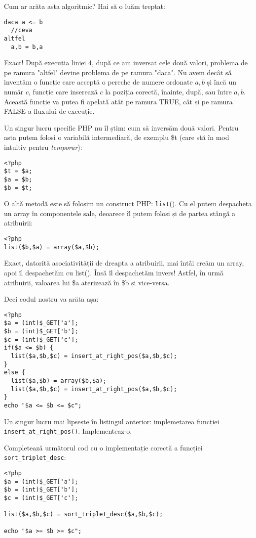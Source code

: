 Cum ar arăta asta algoritmic? Hai să o luăm treptat:
\begin{lstlisting}[language=pseudocod]
daca a <= b
  //ceva
altfel
  a,b = b,a
\end{lstlisting}
Exact! După execuția liniei 4, după ce am inversat cele două valori, problema de pe ramura
"altfel" devine problema de pe ramura "daca". Nu avem decât să inventăm o funcție
care acceptă o pereche de numere ordonate $a,b$ și încă un număr $c$, funcție care inserează
$c$ la poziția corectă, înainte, după, sau între $a,b$. Această funcție va putea
fi apelată atât pe ramura TRUE, cât și pe ramura FALSE a fluxului de execuție.

Un singur lucru specific PHP nu îl știm: cum să inversăm două valori. Pentru
asta putem folosi o variabilă intermediară, de exemplu \$t (care stă în mod intuitiv
pentru \textit{temporar}):
\begin{lstlisting}
<?php
$t = $a;
$a = $b;
$b = $t;
\end{lstlisting}

O altă metodă este să folosim un construct PHP: \texttt{list}().
Cu el putem despacheta un array în componentele sale, deoarece îl
putem folosi și de partea stângă a atribuirii:
\begin{lstlisting}
<?php
list($b,$a) = array($a,$b);
\end{lstlisting}
Exact, datorită asociativității de dreapta a atribuirii, mai întâi
creăm un array, apoi îl despachetăm cu list(). Însă îl despachetăm invers!
Astfel, în urmă atribuirii, valoarea lui \$a aterizează în \$b și vice-versa.

Deci codul nostru va arăta așa:
\begin{lstlisting}
<?php
$a = (int)$_GET['a'];
$b = (int)$_GET['b'];
$c = (int)$_GET['c'];
if($a <= $b) {
  list($a,$b,$c) = insert_at_right_pos($a,$b,$c);
}
else {
  list($a,$b) = array($b,$a);
  list($a,$b,$c) = insert_at_right_pos($a,$b,$c);
}
echo "$a <= $b <= $c";
\end{lstlisting}

\begin{Exercise}[title={Insert at the right position},difficulty=3]
\ExePart
Un singur lucru mai lipsește în listingul anterior: implemetarea funcției
\texttt{insert\_at\_right\_pos()}. Implementeaz-o.

\ExePart
Completează următorul cod cu o implementație corectă a funcției
\texttt{sort\_triplet\_desc}:
\begin{lstlisting}
<?php
$a = (int)$_GET['a'];
$b = (int)$_GET['b'];
$c = (int)$_GET['c'];

list($a,$b,$c) = sort_triplet_desc($a,$b,$c);

echo "$a >= $b >= $c";
\end{lstlisting}
\end{Exercise}

